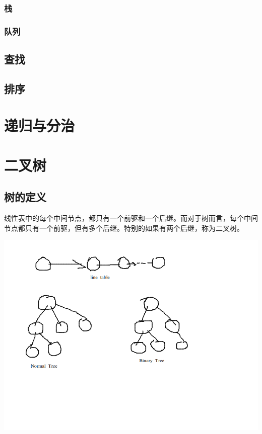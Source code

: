 \documentclass{article}
\begin{document}
\subsubsection{栈}
\subsubsection{队列}
\subsection{查找}
\subsection{排序}
\section{递归与分治}
\section{二叉树}
	\subsection{树的定义}
		线性表中的每个中间节点，都只有一个前驱和一个后继。而对于树而言，每个中间节点都只有一个前驱，但有多个后继。特别的如果有两个后继，称为二叉树。

	\includegraphics[scale=0.4]{./pic/tree-01.png}
\end{document}
